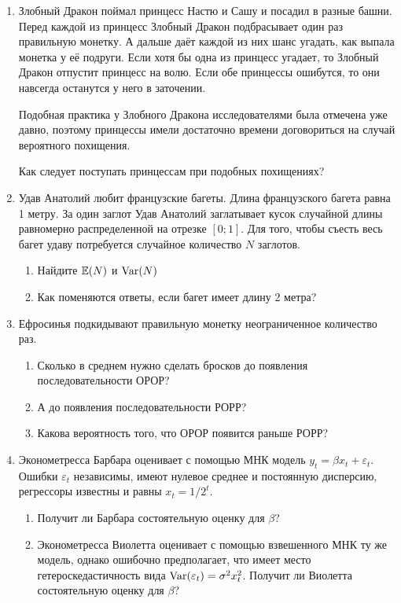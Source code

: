 \documentclass[final,pdftex]{../../template/epsilonj}
\begin{document}
\begin{enumerate}

\item Злобный Дракон поймал принцесс Настю и Сашу и посадил в разные башни. Перед каждой из принцесс Злобный Дракон подбрасывает один раз правильную монетку. А дальше даёт каждой из них шанс угадать, как выпала монетка у её подруги. Если хотя бы одна из принцесс угадает, то Злобный Дракон отпустит принцесс на волю. Если обе принцессы ошибутся, то они навсегда останутся у него в заточении.

Подобная практика у Злобного Дракона исследователями была отмечена уже давно, поэтому принцессы имели достаточно времени договориться на случай вероятного похищения.

Как следует поступать принцессам при подобных похищениях?
\item Удав Анатолий любит французские багеты. Длина французского багета равна 1 метру. За один заглот Удав Анатолий заглатывает кусок случайной длины равномерно распределенной на отрезке $[0;1]$. Для того, чтобы съесть весь багет удаву потребуется случайное количество $N$ заглотов. 
\begin{enumerate}
\item Найдите $\mathbb{E}(N)$ и $\operatorname{Var}(N)$
\item Как поменяются ответы, если багет имеет длину 2 метра?
\end{enumerate}

\item Ефросинья подкидывают правильную монетку неограниченное количество раз. 

\begin{enumerate}
\item Сколько в среднем нужно сделать бросков до появления последовательности ОРОР? 
\item А до появления последовательности РОРР?
\item Какова вероятность того, что ОРОР появится раньше РОРР?
\end{enumerate}

\item Эконометресса Барбара оценивает с помощью МНК модель $y_t=\beta x_t+\varepsilon_t$. Ошибки $\varepsilon_t$ независимы, имеют нулевое среднее и постоянную дисперсию, регрессоры известны и равны $x_t=1/2^t$. 
\begin{enumerate}
\item Получит ли Барбара состоятельную оценку для $\beta$?
\item Эконометресса Виолетта оценивает с помощью взвешенного МНК ту же модель, однако ошибочно предполагает, что имеет место гетероскедастичность вида $\operatorname{Var}(\varepsilon_t)=\sigma^2 x_t^2$. Получит ли Виолетта состоятельную оценку для $\beta$?
\end{enumerate}


\end{enumerate}
\end{document}
